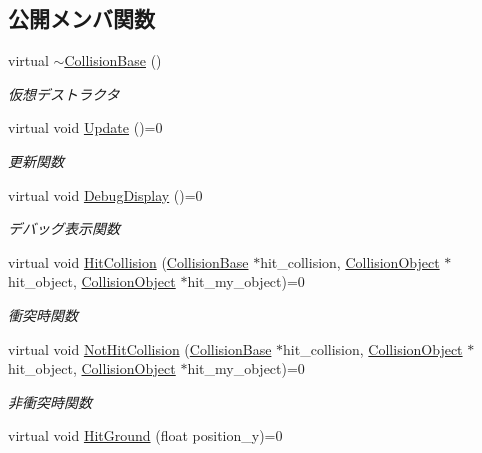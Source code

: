 \subsection*{公開メンバ関数}
\begin{DoxyCompactItemize}
\item 
virtual \mbox{\hyperlink{class_collision_base_a095def3600633e2eb492bf24112e9dc3}{$\sim$\+Collision\+Base}} ()
\begin{DoxyCompactList}\small\item\em 仮想デストラクタ \end{DoxyCompactList}\item 
virtual void \mbox{\hyperlink{class_collision_base_a0f967cf5de4178ee99f434c3ff4f16fd}{Update}} ()=0
\begin{DoxyCompactList}\small\item\em 更新関数 \end{DoxyCompactList}\item 
virtual void \mbox{\hyperlink{class_collision_base_a0b2c1e3b090431d596b6a17e81360932}{Debug\+Display}} ()=0
\begin{DoxyCompactList}\small\item\em デバッグ表示関数 \end{DoxyCompactList}\item 
virtual void \mbox{\hyperlink{class_collision_base_a5c94fe03f875595758e83eb2a176e45d}{Hit\+Collision}} (\mbox{\hyperlink{class_collision_base}{Collision\+Base}} $\ast$hit\+\_\+collision, \mbox{\hyperlink{class_collision_object}{Collision\+Object}} $\ast$hit\+\_\+object, \mbox{\hyperlink{class_collision_object}{Collision\+Object}} $\ast$hit\+\_\+my\+\_\+object)=0
\begin{DoxyCompactList}\small\item\em 衝突時関数 \end{DoxyCompactList}\item 
virtual void \mbox{\hyperlink{class_collision_base_a9b64fc5c3f2aac2a05296985ef799fb1}{Not\+Hit\+Collision}} (\mbox{\hyperlink{class_collision_base}{Collision\+Base}} $\ast$hit\+\_\+collision, \mbox{\hyperlink{class_collision_object}{Collision\+Object}} $\ast$hit\+\_\+object, \mbox{\hyperlink{class_collision_object}{Collision\+Object}} $\ast$hit\+\_\+my\+\_\+object)=0
\begin{DoxyCompactList}\small\item\em 非衝突時関数 \end{DoxyCompactList}\item 
virtual void \mbox{\hyperlink{class_collision_base_a48c9d1d9e4286cde5054d4d2aa70bdd8}{Hit\+Ground}} (float position\+\_\+y)=0

\end{DoxyCompactItemize}
